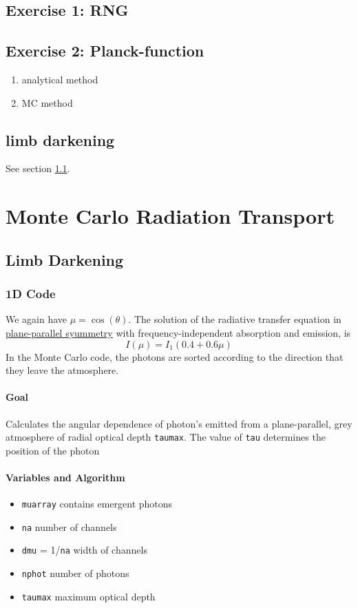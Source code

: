 \documentclass[../main/main.tex]{subfiles}
\begin{document}
\newpage
\subsection{Exercise 1: RNG}
\subsection{Exercise 2: Planck-function}
\begin{enumerate}
\item analytical method
\item MC method
\end{enumerate}
\subsection{limb darkening}
See section \ref{limb_darkening_discussion}.


\newpage
\section{Monte Carlo Radiation Transport}
\subsection{Limb Darkening}
\label{limb_darkening_discussion}

\subsubsection{1D Code}
We again have $\mu = \cos(\theta)$. The solution of the radiative transfer equation in \underline{plane-parallel syummetry} with frequency-independent absorption and emission, is 
\begin{equation}
I(\mu) = I_1 (0.4 + 0.6\mu)
\end{equation}
In the Monte Carlo code, the photons are sorted according to the direction that they leave the atmosphere.

\paragraph{Goal}
Calculates the angular dependence of photon's emitted from a plane-parallel, grey atmosphere of radial optical depth \texttt{taumax}. The value of \texttt{tau} determines the position of the photon

\paragraph{Variables and Algorithm}
\begin{itemize}
\item \texttt{muarray} contains emergent photons
\item \texttt{na} number of channels
\item \texttt{dmu} = 1/\texttt{na} width of channels
\item \texttt{nphot} number of photons
\item \texttt{taumax} maximum optical depth
\end{itemize}
\end{document}
